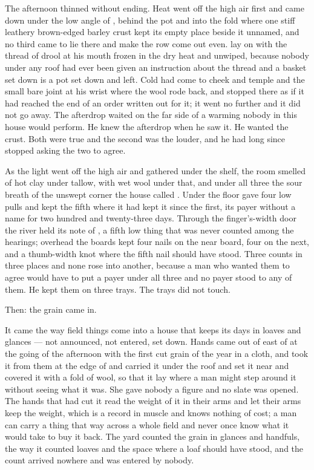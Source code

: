 The afternoon thinned without ending. Heat went off the high air first and came down under the low angle of , behind the pot and into the fold where one stiff leathery brown-edged barley crust kept its empty place beside it unnamed, and no third came to lie there and make the row come out even.  lay on  with the thread of drool at his mouth frozen in the dry heat and unwiped, because nobody under any roof had ever been given an instruction about the thread and a basket set down is a pot set down and left. Cold had come to cheek and temple and the small bare joint at his wrist where the wool rode back, and stopped there as if it had reached the end of an order written out for it; it went no further and it did not go away. The afterdrop waited on the far side of a warming nobody in this house would perform. He knew the afterdrop when he saw it. He wanted the crust. Both were true and the second was the louder, and he had long since stopped asking the two to agree.

As the light went off the high air and gathered under the shelf, the room smelled of hot clay under tallow, with wet wool under that, and under all three the sour  breath of the unswept corner the house called . Under the floor  gave four low pulls and kept the fifth where it had kept it since the first, its payer without a name for two hundred and twenty-three days. Through the finger's-width door the river held its note of , a fifth low thing that was never counted among the hearings; overhead the boards kept four nails on the near board, four on the next, and a thumb-width knot where the fifth nail should have stood. Three counts in three places and none rose into another, because a man who wanted them to agree would have to put a payer under all three and no payer stood to any of them. He kept them on three trays. The trays did not touch.

Then: the grain came in.

It came the way field things come into a house that keeps its days in loaves and glances --- not announced, not entered, set down. Hands came out of  east of  at the going of the afternoon with the first cut grain of the year in a cloth, and  took it from them at the edge of  and carried it under the roof and set it near  and covered it with a fold of wool, so that it lay where a man might step around it without seeing what it was. She gave nobody a figure and no slate was opened. The hands that had cut it read the weight of it in their arms and let their arms keep the weight, which is a record in muscle and knows nothing of cost; a man can carry a thing that way across a whole field and never once know what it would take to buy it back. The yard counted the grain in glances and handfuls, the way it counted loaves and the space where a loaf should have stood, and the count arrived nowhere and was entered by nobody.

